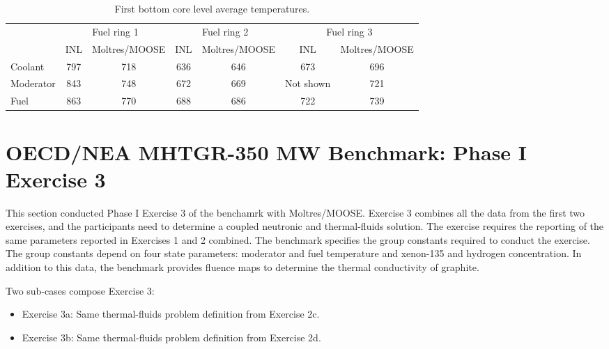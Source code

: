 \begin{table}[htbp!]
\centering
      \caption{First bottom core level average temperatures.}
      \label{tab:th-ex2a-results}
\begin{tabular}{l|c|c|c|c|c|c}
    \toprule
          & \multicolumn{2}{c|}{Fuel ring 1} & \multicolumn{2}{c|}{Fuel ring 2} & \multicolumn{2}{c}{Fuel ring 3} \\ \cline{2-7} 
          & INL     & Moltres/MOOSE     & INL     & Moltres/MOOSE     & INL       & Moltres/MOOSE \\
    \midrule
Coolant   & 797     & 718               & 636     & 646               & 673       & 696           \\
Moderator & 843     & 748               & 672     & 669               & Not shown & 721           \\
Fuel      & 863     & 770               & 688     & 686               & 722       & 739           \\
    \bottomrule
  \end{tabular}
\end{table}

\section{OECD/NEA MHTGR-350 MW Benchmark: Phase I Exercise 3}
\label{sec:ph1ex3}

This section conducted Phase I Exercise 3 of the benchamrk with Moltres/MOOSE.
Exercise 3 combines all the data from the first two exercises, and the participants need to determine a coupled neutronic and thermal-fluids solution.
The exercise requires the reporting of the same parameters reported in Exercises 1 and 2 combined.
The benchmark specifies the group constants required to conduct the exercise.
The group constants depend on four state parameters: moderator and fuel temperature and xenon-135 and hydrogen concentration.
In addition to this data, the benchmark provides fluence maps to determine the thermal conductivity of graphite.

Two sub-cases compose Exercise 3:
\begin{itemize}
  \item Exercise 3a: Same thermal-fluids problem definition from Exercise 2c.
  \item Exercise 3b: Same thermal-fluids problem definition from Exercise 2d.
\end{itemize}

